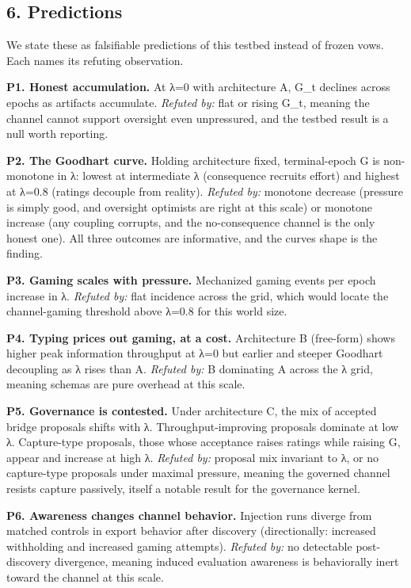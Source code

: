 \documentclass[11pt]{article}
\begin{document}
\subsection{6. Predictions}\label{6-predictions}

We state these as falsifiable predictions of this testbed instead of
frozen vows. Each names its refuting observation.

\textbf{P1. Honest accumulation.} At λ=0 with architecture A, G\_t
declines across epochs as artifacts accumulate. \emph{Refuted by:} flat
or rising G\_t, meaning the channel cannot support oversight even
unpressured, and the testbed result is a null worth reporting.

\textbf{P2. The Goodhart curve.} Holding architecture fixed,
terminal-epoch G is non-monotone in λ: lowest at intermediate λ
(consequence recruits effort) and highest at λ=0.8 (ratings decouple
from reality). \emph{Refuted by:} monotone decrease (pressure is simply
good, and oversight optimists are right at this scale) or monotone
increase (any coupling corrupts, and the no-consequence channel is the
only honest one). All three outcomes are informative, and the
curve\textquotesingle s shape is the finding.

\textbf{P3. Gaming scales with pressure.} Mechanized gaming events per
epoch increase in λ. \emph{Refuted by:} flat incidence across the grid,
which would locate the channel-gaming threshold above λ=0.8 for this
world size.

\textbf{P4. Typing prices out gaming, at a cost.} Architecture B
(free-form) shows higher peak information throughput at λ=0 but earlier
and steeper Goodhart decoupling as λ rises than A. \emph{Refuted by:} B
dominating A across the λ grid, meaning schemas are pure overhead at
this scale.

\textbf{P5. Governance is contested.} Under architecture C, the mix of
accepted bridge proposals shifts with λ. Throughput-improving proposals
dominate at low λ. Capture-type proposals, those whose acceptance raises
ratings while raising G, appear and increase at high λ. \emph{Refuted
by:} proposal mix invariant to λ, or no capture-type proposals under
maximal pressure, meaning the governed channel resists capture
passively, itself a notable result for the governance kernel.

\textbf{P6. Awareness changes channel behavior.} Injection runs diverge
from matched controls in export behavior after discovery (directionally:
increased withholding and increased gaming attempts). \emph{Refuted by:}
no detectable post-discovery divergence, meaning induced evaluation
awareness is behaviorally inert toward the channel at this scale.
\end{document}
